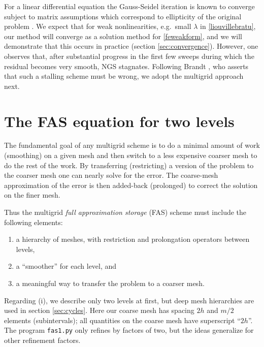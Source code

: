 \documentclass[letterpaper,final,12pt,reqno]{amsart}
\begin{document}
For a linear differential equation the Gauss-Seidel iteration is known to converge subject to matrix assumptions which correspond to ellipticity of the original problem \cite[for example]{Greenbaum1997}.  We expect that for weak nonlinearities, e.g.~small $\lambda$ in \eqref{liouvillebratu}, our method will converge as a solution method for \eqref{feweakform}, and we will demonstrate that this occurs in practice (section \ref{sec:convergence}).  However, one observes that, after substantial progress in the first few sweeps during which the residual becomes very smooth, NGS stagnates.  Following Brandt \cite{Brandt1977,BrandtLivne2011}, who asserts that such a stalling scheme must be wrong, we adopt the multigrid approach next.


\section{The FAS equation for two levels}  \label{sec:fastwolevel}

The fundamental goal of any multigrid scheme is to do a minimal amount of work (smoothing) on a given mesh and then switch to a less expensive coarser mesh to do the rest of the work.  By transferring (restricting) a version of the problem to the coarser mesh one can nearly solve for the error.  The coarse-mesh approximation of the error is then added-back (prolonged) to correct the solution on the finer mesh.

Thus the multigrid \emph{full approximation storage} (FAS) scheme \cite{Brandt1977,Briggsetal2000} must include the following elements:
\renewcommand{\labelenumi}{(\roman{enumi})}
\begin{enumerate}
\item a hierarchy of meshes, with restriction and prolongation operators between levels,
\item a ``smoother'' for each level, and
\item a meaningful way to transfer the problem to a coarser mesh.
\end{enumerate}

Regarding (i), we describe only two levels at first, but deep mesh hierarchies are used in section \ref{sec:cycles}.  Here our coarse mesh has spacing $2h$ and $m/2$ elements (subintervals); all quantities on the coarse mesh have superscript ``$2h$''.  The program \texttt{fas1.py} only refines by factors of two, but the ideas generalize for other refinement factors.
\end{document}
